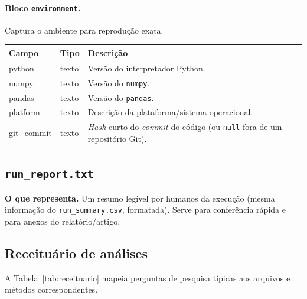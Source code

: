 \documentclass[11pt,a4paper]{article}
\begin{document}
\paragraph{Bloco \texttt{environment}.} Captura o ambiente para reprodução exata.
\begin{center}\small
\begin{tabular}{@{}>{\ttfamily}l l p{7.8cm}@{}}
\toprule
\normalfont Campo & \normalfont Tipo & \normalfont Descrição \\
\midrule
python      & texto & Versão do interpretador Python. \\
numpy       & texto & Versão do \texttt{numpy}. \\
pandas      & texto & Versão do \texttt{pandas}. \\
platform    & texto & Descrição da plataforma/sistema operacional. \\
git\_commit & texto & \emph{Hash} curto do \emph{commit} do código (ou \texttt{null} fora de um repositório Git). \\
\bottomrule
\end{tabular}
\end{center}

\subsection{\texttt{run\_report.txt}}

\textbf{O que representa.} Um resumo legível por humanos da execução (mesma
informação do \texttt{run\_summary.csv}, formatada). Serve para conferência rápida
e para anexos do relatório/artigo.

\subsection{Receituário de análises}

A Tabela~\ref{tab:receituario} mapeia perguntas de pesquisa típicas aos arquivos e
métodos correspondentes.
\end{document}
